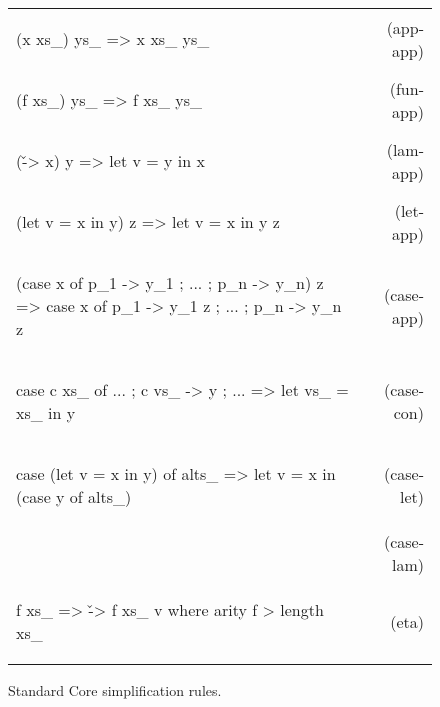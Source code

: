 \documentclass[preprint]{sigplanconf}
\newcommand{\simp}[2]{\vspace{-7mm} #2 & (#1) \\}
\newenvironment{simplify}
    {\noindent
     \begin{flushright}
     \begin{tabular}{p{6.5cm}r}
    }
    {\end{tabular}
     \vspace{-7mm}
     \end{flushright}
    }
\begin{document}
\begin{figure}
\begin{simplify}

\simp{app-app}{
\ignore\begin{code}
(x xs_) ys_
    => x xs_ ys_
\end{code}}

\simp{fun-app}{
\ignore\begin{code}
(f xs_) ys_
    => f xs_ ys_
\end{code}}

\simp{lam-app}{
\ignore\begin{code}
(\v -> x) y
    => let v = y in x
\end{code}}

\simp{let-app}{
\ignore\begin{code}
(let v = x in y) z
    => let v = x in y z
\end{code}}

\simp{case-app}{
\ignore\begin{code}
(case x of {p_1 -> y_1 ; ... ; p_n -> y_n}) z
    => case x of {p_1 -> y_1 z ; ... ; p_n -> y_n z}
\end{code}}

\simp{case-con}{
\ignore\begin{code}
case c xs_ of {... ; c vs_ -> y ; ...}
    => let vs_ = xs_ in y
\end{code}}

\simp{case-let}{
\ignore\begin{code}
case (let v = x in y) of alts_
    => let v = x in (case y of alts_)
\end{code}}

\simp{case-case}{
\ignore\begin{code}
case (case x of {... ; c vs_ -> y ; ...) of alts_
    => case x of {... ; c vs_ -> case y of alts_ ; ...}
\end{code}}

\simp{case-lam}{
\ignore\begin{code}
case x of {... ; c vs_ -> \v -> y ; ...}
    => \z -> case x of {... ; c vs_ -> (\v -> y) z ; ...} z
\end{code}}

\simp{eta}{
\ignore\begin{code}
f xs_
    => \v -> f xs_ v
    where arity f > length xs_
\end{code}}

\end{simplify}
\caption{Standard Core simplification rules.}
\label{fig:simplify}
\end{figure}
\end{document}
